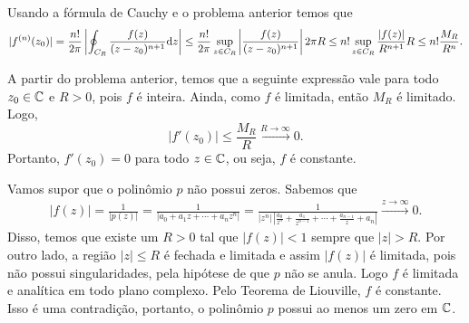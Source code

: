 \begin{questions}
\begin{solution}
    Usando a fórmula de Cauchy e o problema anterior temos que
    \begin{align*}
     |f^{(n)}(z_0)|
        = \frac{n!}{2\pi} \left| \oint_{C_R} \frac{f(z)}{(z-z_0)^{n+1}} \mathrm{d} z \right| 
        \leq \frac{n!}{2\pi} \sup_{z\in C_R}\left| \frac{f(z)}{(z-z_0)^{n+1}} \right| 2\pi R 
        \leq n! \sup_{z\in C_R} \frac{|f(z)|}{R^{n+1}} R 
        \leq n! \frac{M_R}{R^n}.
    \end{align*}
\end{solution}

\begin{solution}
A partir do problema anterior, temos que a seguinte expressão vale para todo $z_0\in{\mathbb C}$ e $R>0$, pois $f$ é inteira. Ainda, como $f$ é limitada, então $M_R$ é limitado. Logo,
    \[
        |f'(z_0)| \le \frac{M_R}{R} \xrightarrow{R \to \infty} 0.
    \]
Portanto, $f'(z_0) = 0$ para todo $z\in{\mathbb C}$, ou seja, $f$ é constante.
\end{solution}

\begin{solution}
    Vamos supor que o polinômio $p$ não possui zeros.
    Sabemos que
    \begin{align*}
        |f(z)| = \frac{1}{|p(z)|}
            = \frac{1}{|a_0 + a_1z + \cdots + a_nz^n|}
            = \frac{1}{|z^n|\,\left|\frac{a_0}{z^n} + \frac{a_1}{z^{n-1}} + \cdots + \frac{a_{n-1}}{z} + a_n\right|} \xrightarrow{z \to \infty} 0.
    \end{align*}
    Disso, temos que existe um $R>0$ tal que $|f(z)|<1$ sempre que $|z|>R$.
    Por outro lado, a região $|z|\le R$ é fechada e limitada e assim $|f(z)|$ é limitada, pois não possui singularidades, pela hipótese de que $p$ não se anula. Logo $f$ é limitada e analítica em todo plano complexo.
    Pelo Teorema de Liouville, $f$ é constante. Isso é uma contradição, portanto, o polinômio $p$ possui ao menos um zero em ${\mathbb C}$.
\end{solution}


\end{questions}
